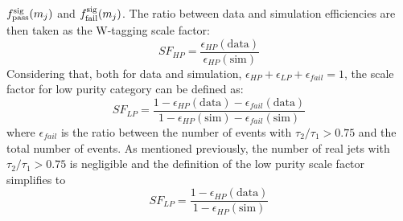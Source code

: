 $f^{\rm sig}_{\rm pass}(m_{j})$ and $f^{\rm sig}_{\rm fail}(m_{j})$. The ratio between data and simulation efficiencies are then taken as the W-tagging scale factor:
\begin{equation}
  \label{SF}
  SF_{HP}= \frac{\epsilon_{HP}(\textrm{data})}{\epsilon_{HP}(\textrm{sim})}
\end{equation}
Considering that, both for data and simulation, $\epsilon_{HP}+\epsilon_{LP}+\epsilon_{fail} = 1$, the scale factor for low purity category can be defined as:
\begin{equation*}
  SF_{LP} = \frac{1-\epsilon_{HP}(\textrm{data})-\epsilon_{fail}(\textrm{data})}{1-\epsilon_{HP}(\textrm{sim})-\epsilon_{fail}(\textrm{sim})}
\end{equation*}
where $\epsilon_{fail}$ is the ratio between the number of events with $\tau_2/\tau_1 > 0.75$ and the total number of events. As mentioned previously, the number of real \PW jets with $\tau_2/\tau_1 > 0.75$  is negligible and the definition of the low purity scale factor simplifies to
\begin{equation}
  SF_{LP} = \frac{1-\epsilon_{HP}(\textrm{data})}{1-\epsilon_{HP}(\textrm{sim})}
\end{equation}

